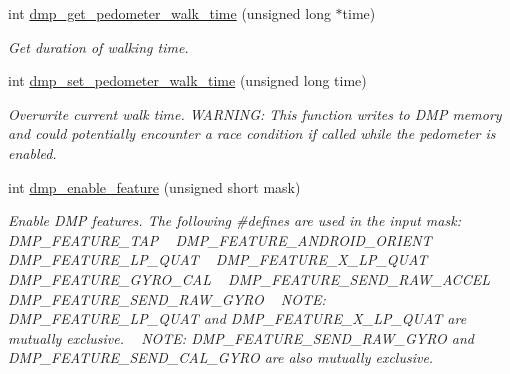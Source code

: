\begin{DoxyCompactItemize}
int \hyperlink{group___d_r_i_v_e_r_s_ga62c8e5e99986b0e60ca0dc9a9b9c3fcc}{dmp\+\_\+get\+\_\+pedometer\+\_\+walk\+\_\+time} (unsigned long $\ast$time)
\begin{DoxyCompactList}\small\item\em Get duration of walking time. \end{DoxyCompactList}\item 
int \hyperlink{group___d_r_i_v_e_r_s_ga62f469269047f8cba16a2b7f5349acc0}{dmp\+\_\+set\+\_\+pedometer\+\_\+walk\+\_\+time} (unsigned long time)
\begin{DoxyCompactList}\small\item\em Overwrite current walk time. W\+A\+R\+N\+I\+NG\+: This function writes to D\+MP memory and could potentially encounter a race condition if called while the pedometer is enabled. \end{DoxyCompactList}\item 
int \hyperlink{group___d_r_i_v_e_r_s_ga70c485bdfa30515e5b869b081192caa1}{dmp\+\_\+enable\+\_\+feature} (unsigned short mask)
\begin{DoxyCompactList}\small\item\em Enable D\+MP features. The following \#define\textquotesingle{}s are used in the input mask\+: ~\newline
 D\+M\+P\+\_\+\+F\+E\+A\+T\+U\+R\+E\+\_\+\+T\+AP ~\newline
 D\+M\+P\+\_\+\+F\+E\+A\+T\+U\+R\+E\+\_\+\+A\+N\+D\+R\+O\+I\+D\+\_\+\+O\+R\+I\+E\+NT ~\newline
 D\+M\+P\+\_\+\+F\+E\+A\+T\+U\+R\+E\+\_\+\+L\+P\+\_\+\+Q\+U\+AT ~\newline
 D\+M\+P\+\_\+\+F\+E\+A\+T\+U\+R\+E\+\_\+X\+\_\+\+L\+P\+\_\+\+Q\+U\+AT ~\newline
 D\+M\+P\+\_\+\+F\+E\+A\+T\+U\+R\+E\+\_\+\+G\+Y\+R\+O\+\_\+\+C\+AL ~\newline
 D\+M\+P\+\_\+\+F\+E\+A\+T\+U\+R\+E\+\_\+\+S\+E\+N\+D\+\_\+\+R\+A\+W\+\_\+\+A\+C\+C\+EL ~\newline
 D\+M\+P\+\_\+\+F\+E\+A\+T\+U\+R\+E\+\_\+\+S\+E\+N\+D\+\_\+\+R\+A\+W\+\_\+\+G\+Y\+RO ~\newline
 N\+O\+TE\+: D\+M\+P\+\_\+\+F\+E\+A\+T\+U\+R\+E\+\_\+\+L\+P\+\_\+\+Q\+U\+AT and D\+M\+P\+\_\+\+F\+E\+A\+T\+U\+R\+E\+\_\+X\+\_\+\+L\+P\+\_\+\+Q\+U\+AT are mutually exclusive. ~\newline
 N\+O\+TE\+: D\+M\+P\+\_\+\+F\+E\+A\+T\+U\+R\+E\+\_\+\+S\+E\+N\+D\+\_\+\+R\+A\+W\+\_\+\+G\+Y\+RO and D\+M\+P\+\_\+\+F\+E\+A\+T\+U\+R\+E\+\_\+\+S\+E\+N\+D\+\_\+\+C\+A\+L\+\_\+\+G\+Y\+RO are also mutually exclusive. \end{DoxyCompactList}\item 

\end{DoxyCompactItemize}
